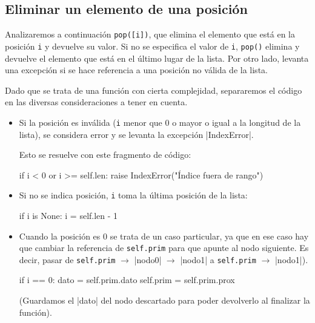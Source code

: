 \subsection{Eliminar un elemento de una posición}

Analizaremos a continuación \lstinline|pop([i])|, que elimina el elemento que
está en la posición \lstinline!i! y devuelve su valor. Si no se especifica
el valor de \lstinline!i!, \lstinline|pop()| elimina y devuelve el elemento
que está en el último lugar de la lista.  Por otro lado, levanta una
excepción si se hace referencia a una posición no válida de la lista.

Dado que se trata de una función con cierta complejidad, separaremos el
código en las diversas consideraciones a tener en cuenta.

\begin{itemize}

\item Si la posición es inválida (\lstinline!i! menor que $0$ o mayor o
igual a la longitud de la lista), se considera error y se levanta la
excepción |IndexError|.

Esto se resuelve con este fragmento de código:

\begin{codigo-python-sn}
if i < 0 or i >= self.len:
    raise IndexError("Índice fuera de rango")
\end{codigo-python-sn}

\item Si no se indica posición, \lstinline!i! toma la última posición de la
lista:

\begin{codigo-python-sn}
if i is None:
    i = self.len - 1
\end{codigo-python-sn}

\item Cuando la posición es $0$ se trata de un caso particular, ya que en ese
caso hay que cambiar la referencia de
\lstinline!self.prim! para que apunte al nodo siguiente.  Es decir, pasar de
\lstinline!self.prim! $\rightarrow$ |nodo0| $\rightarrow$ |nodo1| a
\lstinline!self.prim! $\rightarrow$ |nodo1|).

\begin{codigo-python-sn}
if i == 0:
    dato = self.prim.dato
    self.prim = self.prim.prox
\end{codigo-python-sn}

\noindent (Guardamos el |dato| del nodo descartado para poder devolverlo al
finalizar la función).


\end{itemize}
